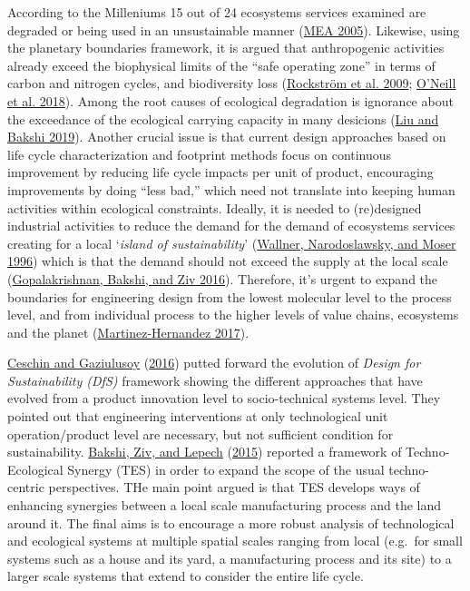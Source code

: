 \documentclass[
  14pt,
]{extarticle}
\begin{document}
According to the Milleniums 15 out of 24 ecosystems services examined are degraded or being used in an unsustainable manner (\protect\hyperlink{ref-MEA2005}{MEA 2005}).
Likewise, using the planetary boundaries framework, it is argued that anthropogenic activities already exceed the biophysical limits of the ``safe operating zone'' in terms of carbon and nitrogen cycles, and biodiversity loss (\protect\hyperlink{ref-Rockstrom2009}{Rockström et al. 2009}; \protect\hyperlink{ref-ONeill2018}{O'Neill et al. 2018}).
Among the root causes of ecological degradation is ignorance about the exceedance of the ecological carrying capacity in many desicions (\protect\hyperlink{ref-Liu2019g}{Liu and Bakshi 2019}).
Another crucial issue is that current design approaches based on life cycle characterization and footprint methods focus on continuous improvement by reducing life cycle impacts per unit of product, encouraging improvements by doing ``less bad,'' which need not translate into keeping human activities within ecological constraints.
Ideally, it is needed to (re)designed industrial activities to reduce the demand for the demand of ecosystems services creating for a local `\emph{island of sustainability}' (\protect\hyperlink{ref-Wallner1996}{Wallner, Narodoslawsky, and Moser 1996}) which is that the demand should not exceed the supply at the local scale (\protect\hyperlink{ref-Gopalakrishnan2016}{Gopalakrishnan, Bakshi, and Ziv 2016}).
Therefore, it's urgent to expand the boundaries for engineering design from the lowest molecular level to the process level, and from individual process to the higher levels of value chains, ecosystems and the planet (\protect\hyperlink{ref-Martinez-Hernandez2017}{Martinez-Hernandez 2017}).

\protect\hyperlink{ref-Ceschin2016}{Ceschin and Gaziulusoy} (\protect\hyperlink{ref-Ceschin2016}{2016}) putted forward the evolution of \emph{Design for Sustainability (DfS)} framework showing the different approaches that have evolved from a product innovation level to socio-technical systems level.
They pointed out that engineering interventions at only technological unit operation/product level are necessary, but not sufficient condition for sustainability.
\protect\hyperlink{ref-Bakshi2015}{Bakshi, Ziv, and Lepech} (\protect\hyperlink{ref-Bakshi2015}{2015}) reported a framework of Techno-Ecological Synergy (TES) in order to expand the scope of the usual techno-centric perspectives.
THe main point argued is that TES develops ways of enhancing synergies between a local scale manufacturing process and the land around it.
The final aims is to encourage a more robust analysis of technological and ecological systems at multiple spatial scales ranging from local (e.g.~for small systems such as a house and its yard, a manufacturing process and its site) to a larger scale systems that extend to consider the entire life cycle.
\end{document}
